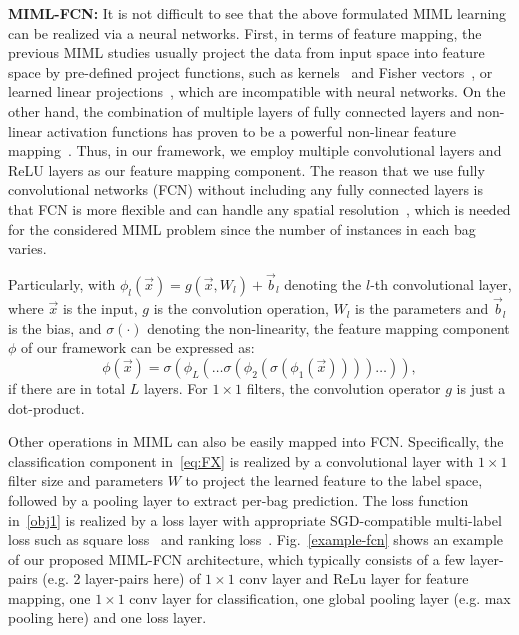 \documentclass[10pt,twocolumn,letterpaper]{article}
\begin{document}
\textbf{MIML-FCN:} It is not difficult to see that the above
formulated MIML learning can be realized via a neural networks.
First, in terms of feature mapping, the previous MIML studies
usually project the data from input space into feature space by
pre-defined project functions, such as kernels~\cite{Andrews2002}
and Fisher vectors~\cite{Wei2014}, or learned linear
projections~\cite{Huang2014}, which are incompatible with neural
networks. On the other hand, the combination of multiple layers of
fully connected layers and non-linear activation functions has
proven to be a powerful non-linear feature mapping~\cite{Cho2009,
	Perronnin2015}. Thus, in our framework, we employ multiple
convolutional layers and ReLU layers as our feature mapping
component. The reason that we use fully convolutional networks
(FCN) without including any fully connected layers is that FCN is
more flexible and can handle any spatial resolution~\cite{Oquab2014},
which is needed for the considered MIML problem since the number
of instances in each bag varies.

Particularly, with $\phi_l(\vec{x}) = g(\vec{x}, W_l) + \vec{b}_l$
denoting the $l$-th convolutional layer, where $\vec{x}$ is the
input, $g$ is the convolution operation, $W_l$ is the parameters
and $\vec{b}_l$ is the bias, and $\sigma(\cdot)$ denoting the
non-linearity, the feature mapping component $\phi$ of our
framework can be expressed as:
\begin{equation}
\phi(\vec{x}) =  \sigma(\phi_L(\dots
\sigma(\phi_2(\sigma(\phi_1(\vec{x}))))\dots)),
\end{equation}
if there are in total $L$ layers. For $1\times 1$ filters, the
convolution operator $g$ is just a dot-product.

Other operations in MIML can also be easily mapped into FCN.
Specifically, the classification component in~\eqref{eq:FX} is
realized by a convolutional layer with $1 \times 1$ filter size
and parameters $W$ to project the learned feature to the label
space,  followed by a pooling layer to extract per-bag prediction.
The loss function in~\eqref{obj1} is realized by a loss layer with
appropriate SGD-compatible multi-label loss such as square
loss~\cite{Wei2014,Yang2016b} and ranking
loss~\cite{Wei2014,Yang2016a}. Fig.~\ref{example-fcn} shows an
example of our proposed MIML-FCN architecture, which typically
consists of a few layer-pairs (e.g. 2 layer-pairs here) of
$1\times 1$ conv layer and ReLu layer for feature mapping, one
$1\times 1$ conv layer for classification, one global pooling
layer (e.g. max pooling here) and one loss layer.
\end{document}
